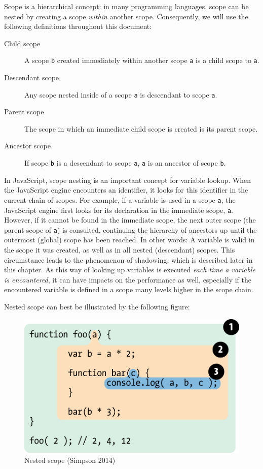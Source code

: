 Scope is a hierarchical concept: in many programming languages, scope
can be nested by creating a scope \emph{within} another scope.
Consequently, we will use the following definitions throughout this
document:

\begin{description}
\item[Child scope]
A scope \texttt{b} created immediately within another scope \texttt{a}
is a child scope to \texttt{a}.
\item[Descendant scope]
Any scope nested inside of a scope \texttt{a} is descendant to scope
\texttt{a}.
\item[Parent scope]
The scope in which an immediate child scope is created is its parent
scope.
\item[Ancestor scope]
If scope \texttt{b} is a descendant to scope \texttt{a}, \texttt{a} is
an ancestor of scope \texttt{b}.
\end{description}

In JavaScript, scope nesting is an important concept for variable
lookup. When the JavaScript engine encounters an identifier, it looks
for this identifier in the current chain of scopes. For example, if a
variable is used in a scope \texttt{a}, the JavaScript engine first
looks for its declaration in the immediate scope, \texttt{a}. However,
if it cannot be found in the immediate scope, the next outer scope (the
parent scope of \texttt{a}) is consulted, continuing the hierarchy of
ancestors up until the outermost (global) scope has been reached. In
other words: A variable is valid in the scope it was created, as well as
in all nested (descendant) scopes. This circumstance leads to the
phenomenon of shadowing, which is described later in this chapter. As
this way of looking up variables is executed \emph{each time a variable
is encountered}, it can have impacts on the performance as well,
especially if the encountered variable is defined in a scope many levels
higher in the scope chain.

Nested scope can best be illustrated by the following figure:

\begin{figure}[htbp]
\centering
\includegraphics[keepaspectratio]{img/fig2.png}
\caption{Nested scope (Simpson 2014)}
\label{fig:getify}
\end{figure}

